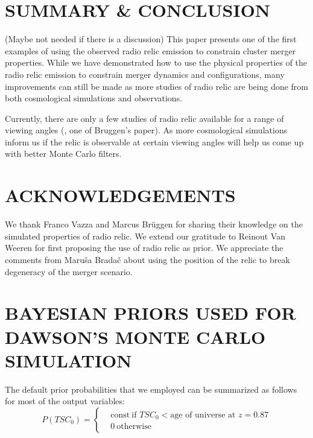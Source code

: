 
\section{SUMMARY \& CONCLUSION} (Maybe not needed if there is a discussion)
This paper presents one of the first examples of using the observed radio
relic emission to constrain cluster merger properties.
While we have demonstrated how to use the physical properties of the radio
relic emission to constrain merger dynamics and configurations, many
improvements can still be made as more studies of radio relic are being
done from both cosmological simulations and observations.

Currently, there are only a few studies of
 radio relic available for a range of viewing angles (, one of
Bruggen's paper). As more cosmological simulations inform us  
if the relic is observable at certain viewing angles will help us 
come up with better Monte Carlo filters. 

\section{ACKNOWLEDGEMENTS}
We thank Franco Vazza and Marcus Br\"{u}ggen for sharing their knowledge on
the simulated properties of radio relic. We
extend our gratitude to Reinout Van Weeren for first proposing the use of
radio relic as prior. We appreciate the comments from Maru\v{s}a
Brada\v{c} about using the position of the relic to break degeneracy
of the merger scenario. 





\appendix

\section{BAYESIAN PRIORS USED FOR DAWSON'S MONTE CARLO SIMULATION}
\label{app:priors}
%
The default prior probabilities that we employed can be summarized as
follows for most of the output variables: 
\begin{equation}
	P(TSC_0) = 
	\begin{cases}
		& \text{const}~\text{if }TSC_0 < \text{age of universe at } z=0.87	\\
		& 0~\text{otherwise}
	\end{cases}
\end{equation}

